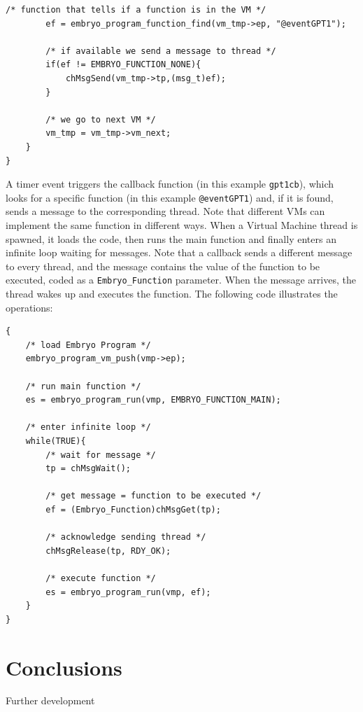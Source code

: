 \documentclass[a4paper,10pt]{article}
\begin{document}
\begin{multicols}{2}
\begin{lstlisting}[caption={Callback looking for a function in VMs}]
		/* function that tells if a function is in the VM */
		ef = embryo_program_function_find(vm_tmp->ep, "@eventGPT1");
		
		/* if available we send a message to thread */
		if(ef != EMBRYO_FUNCTION_NONE){
			chMsgSend(vm_tmp->tp,(msg_t)ef);
		}
		
		/* we go to next VM */
		vm_tmp = vm_tmp->vm_next;
	}
}
\end{lstlisting}
\medskip
A timer event triggers the callback function (in this example \texttt{gpt1cb}), which looks for a specific function (in this example \texttt{@eventGPT1}) and, if it is found, sends a message to the corresponding thread. Note that different VMs can implement the same function in different ways.\newline
When a Virtual Machine thread is spawned, it loads the code, then runs the main function and finally enters an infinite loop waiting for messages. Note that a callback sends a different message to every thread, and the message contains the value of the function to be executed, coded as a \texttt{Embryo\_Function} parameter. When the message arrives, the thread wakes up and executes the function. The following code illustrates the operations:
\medskip
\lstset{language=C}
\begin{lstlisting}[caption={Callback looking for a function in VMs}]
{
	/* load Embryo Program */
	embryo_program_vm_push(vmp->ep);
	
	/* run main function */
	es = embryo_program_run(vmp, EMBRYO_FUNCTION_MAIN);
	
	/* enter infinite loop */
	while(TRUE){
		/* wait for message */
		tp = chMsgWait();
		
		/* get message = function to be executed */
		ef = (Embryo_Function)chMsgGet(tp);
		
		/* acknowledge sending thread */
		chMsgRelease(tp, RDY_OK);
		
		/* execute function */
		es = embryo_program_run(vmp, ef);
	}
}
\end{lstlisting}\medskip

\section{Conclusions}

Further development


%


\end{multicols}
\end{document}
